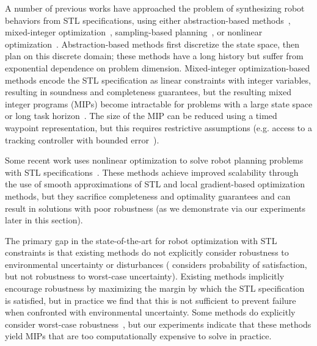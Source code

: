 A number of previous works have approached the problem of synthesizing robot behaviors from STL specifications, using either abstraction-based methods~\cite{plakuMotionPlanningTemporallogic2016}, mixed-integer optimization~\cite{sunMultiagentMotionPlanning2022,yangSynthesisguidedAdversarialScenario2021}, sampling-based planning~\cite{kantaros20,vasile17}, or nonlinear optimization~\cite{pantFlybyLogicControlMultiDrone2018,pantazidesSatelliteMissionPlanning2022,leungBackPropagationSignalTemporal2021}.
%
Abstraction-based methods first discretize the state space, then plan on this discrete domain; these methods have a long history but suffer from exponential dependence on problem dimension. Mixed-integer optimization-based methods encode the STL specification as linear constraints with integer variables, resulting in soundness and completeness guarantees, but the resulting mixed integer programs (MIPs) become intractable for problems with a large state space or long task horizon~\cite{sadraddiniRobustTemporalLogic2016,yangSynthesisguidedAdversarialScenario2021,raman15}. The size of the MIP can be reduced using a timed waypoint representation, but this requires restrictive assumptions (e.g. access to a tracking controller with bounded error~\cite{sunMultiagentMotionPlanning2022}).

Some recent work uses nonlinear optimization to solve robot planning problems with STL specifications~\cite{pantSmoothOperatorControl2017,pantazidesSatelliteMissionPlanning2022,leungBackPropagationSignalTemporal2021,takanoContinuousOptimizationBasedTask2021,leeSignalTemporalLogic2021}. These methods achieve improved scalability through the use of smooth approximations of STL and local gradient-based optimization methods, but they sacrifice completeness and optimality guarantees and can result in solutions with poor robustness (as we demonstrate via our experiments later in this section).

The primary gap in the state-of-the-art for robot optimization with STL constraints is that existing methods do not explicitly consider robustness to environmental uncertainty or disturbances (\cite{leeSignalTemporalLogic2021} considers probability of satisfaction, but not robustness to worst-case uncertainty). Existing methods implicitly encourage robustness by maximizing the margin by which the STL specification is satisfied, but in practice we find that this is not sufficient to prevent failure when confronted with environmental uncertainty. Some methods do explicitly consider worst-case robustness~\cite{raman15}, but our experiments indicate that these methods yield MIPs that are too computationally expensive to solve in practice.

